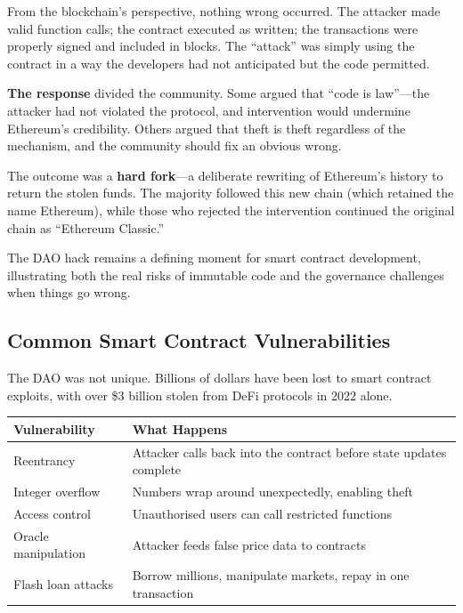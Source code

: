 \documentclass[11pt,a4paper]{article}
\newcommand{\keyword}[1]{\textbf{\textcolor{AccentOrange}{#1}}}
\begin{document}
From the blockchain's perspective, nothing wrong occurred. The attacker made valid function calls; the contract executed as written; the transactions were properly signed and included in blocks. The ``attack'' was simply using the contract in a way the developers had not anticipated but the code permitted.

\textbf{The response} divided the community. Some argued that ``code is law''---the attacker had not violated the protocol, and intervention would undermine Ethereum's credibility. Others argued that theft is theft regardless of the mechanism, and the community should fix an obvious wrong.

The outcome was a \keyword{hard fork}---a deliberate rewriting of Ethereum's history to return the stolen funds. The majority followed this new chain (which retained the name Ethereum), while those who rejected the intervention continued the original chain as ``Ethereum Classic.''

The DAO hack remains a defining moment for smart contract development, illustrating both the real risks of immutable code and the governance challenges when things go wrong.

\subsection{Common Smart Contract Vulnerabilities}

The DAO was not unique. Billions of dollars have been lost to smart contract exploits, with over \$3 billion stolen from DeFi protocols in 2022 alone.

\begin{center}
\begin{tabular}{lp{8cm}}
\toprule
\textbf{Vulnerability} & \textbf{What Happens} \\
\midrule
Reentrancy & Attacker calls back into the contract before state updates complete \\
Integer overflow & Numbers wrap around unexpectedly, enabling theft \\
Access control & Unauthorised users can call restricted functions \\
Oracle manipulation & Attacker feeds false price data to contracts \\
Flash loan attacks & Borrow millions, manipulate markets, repay in one transaction \\
\bottomrule
\end{tabular}
\end{center}
\end{document}
